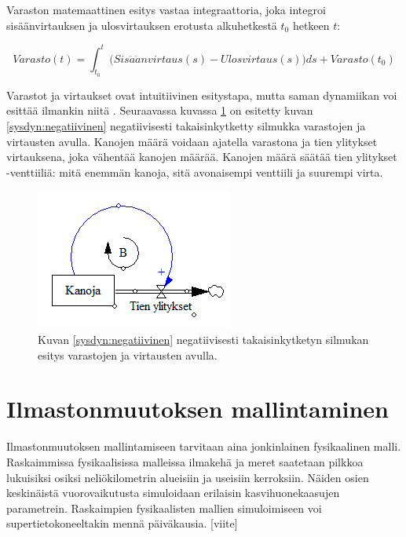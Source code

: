 \documentclass[finnish,12pt,a4paper,pdftex]{article}
\begin{document}
\begin{onehalfspacing}
Varaston matemaattinen esitys vastaa integraattoria, joka integroi sisäänvirtauksen ja ulosvirtauksen erotusta alkuhetkestä $t_0$ hetkeen $t$: 

\begin{equation}
  Varasto(t) = \int_{t_0}^t \Big( Sis\ddot{a}\ddot{a}nvirtaus(s) - Ulosvirtaus(s) \Big) ds + Varasto(t_0)
\end{equation} \cite[s. 194--195]{Sterman2000} 

Varastot ja virtaukset ovat intuitiivinen esitystapa, mutta saman dynamiikan voi esittää ilmankin niitä \cite[s. 191--230]{Sterman2000}. Seuraavassa kuvassa \ref{sysdyn:varastovirtauskana} on esitetty kuvan \ref{sysdyn:negatiivinen} negatiivisesti takaisinkytketty silmukka varastojen ja virtausten avulla. Kanojen määrä voidaan ajatella varastona ja tien ylitykset virtauksena, joka vähentää kanojen määrää. Kanojen määrä säätää tien ylitykset -venttiiliä: mitä enemmän kanoja, sitä avonaisempi venttiili ja suurempi virta. 

\begin{figure}[H]
\centering \includegraphics{varastovirtauskana}
\caption{Kuvan \ref{sysdyn:negatiivinen} negatiivisesti takaisinkytketyn silmukan esitys varastojen ja virtausten avulla. \label{sysdyn:varastovirtauskana}}
\end{figure}


\clearpage
\section{Ilmastonmuutoksen mallintaminen \label{ilmasto}}

Ilmastonmuutoksen mallintamiseen tarvitaan aina jonkinlainen fysikaalinen malli. Raskaimmissa fysikaalisissa malleissa ilmakehä ja meret saatetaan pilkkoa lukuisiksi osiksi neliökilometrin alueisiin ja useisiin kerroksiin. Näiden osien keskinäistä vuorovaikutusta simuloidaan erilaisin kasvihuonekaasujen parametrein. Raskaimpien fysikaalisten mallien simuloimiseen voi supertietokoneeltakin mennä päiväkausia. [viite]


\end{onehalfspacing}
\end{document}
